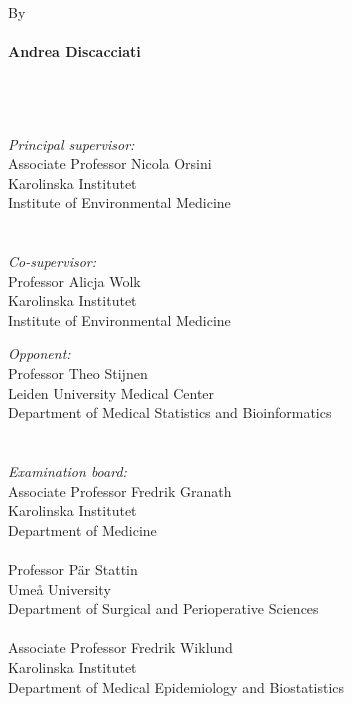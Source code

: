 %
\null
\vspace{.5cm}
\\
\\
\\
\\
\\
By
\\
\\
{\Large \textbf{\textsf{Andrea Discacciati}}}
\\
\\
\\
\\
\begin{minipage}[t]{5.5cm}
\singlespacing
{\small
\textit{Principal supervisor:}\\
Associate Professor Nicola Orsini \\
Karolinska Institutet \\
Institute of Environmental Medicine \\
\\
\\
\textit{Co-supervisor:}\\
Professor Alicja Wolk \\
Karolinska Institutet \\
Institute of Environmental Medicine
}
\end{minipage}
\hspace{1.5cm}
\begin{minipage}[t]{8cm}
\singlespacing
{\small
\textit{Opponent:}\\
Professor Theo Stijnen \\
Leiden University Medical Center \\
Department of Medical Statistics and Bioinformatics \\
\\
\\
\textit{Examination board:}\\
Associate Professor Fredrik Granath \\
Karolinska Institutet \\
Department of Medicine \\
\\
Professor Pär Stattin \\
Umeå University \\
Department of Surgical and Perioperative Sciences \\
\\
Associate Professor Fredrik Wiklund \\
Karolinska Institutet \\
Department of Medical Epidemiology and Biostatistics
}
\end{minipage}

